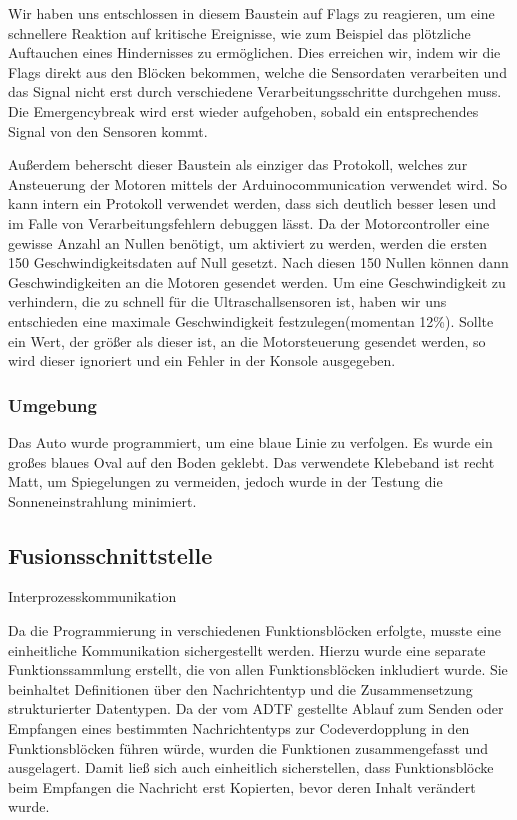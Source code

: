 \documentclass[12pt,a4paper]{report}
\begin{document}
Wir haben uns entschlossen in diesem Baustein auf Flags zu reagieren, um eine schnellere Reaktion auf kritische Ereignisse, wie zum Beispiel das plötzliche Auftauchen eines Hindernisses zu ermöglichen. Dies erreichen wir, indem wir die Flags direkt aus den Blöcken bekommen, welche die Sensordaten verarbeiten und das Signal nicht erst durch verschiedene Verarbeitungsschritte durchgehen muss. Die Emergencybreak wird erst wieder aufgehoben, sobald ein entsprechendes Signal von den Sensoren kommt.

Außerdem beherscht dieser Baustein als einziger das Protokoll, welches zur Ansteuerung der Motoren mittels der Arduinocommunication verwendet wird. So kann intern ein Protokoll verwendet werden, dass sich deutlich besser lesen und im Falle von Verarbeitungsfehlern debuggen lässt. Da der Motorcontroller eine gewisse Anzahl an Nullen benötigt, um aktiviert zu werden, werden die ersten 150 Geschwindigkeitsdaten auf Null gesetzt. Nach diesen 150 Nullen können dann Geschwindigkeiten an die Motoren gesendet werden. Um eine Geschwindigkeit zu verhindern, die zu schnell für die Ultraschallsensoren ist, haben wir uns entschieden eine maximale Geschwindigkeit festzulegen(momentan 12\%). Sollte ein Wert, der größer als dieser ist, an die Motorsteuerung gesendet werden, so wird dieser ignoriert und ein Fehler in der Konsole ausgegeben.

\subsubsection{Umgebung}
Das Auto wurde programmiert, um eine blaue Linie zu verfolgen. Es wurde ein großes blaues Oval auf den Boden geklebt. Das verwendete Klebeband ist recht Matt, um Spiegelungen zu vermeiden, jedoch wurde in der Testung die Sonneneinstrahlung minimiert.


\subsection{Fusionsschnittstelle}
Interprozesskommunikation

Da die Programmierung in verschiedenen Funktionsblöcken erfolgte, musste eine einheitliche Kommunikation sichergestellt werden. Hierzu wurde eine separate Funktionssammlung erstellt, die von allen Funktionsblöcken inkludiert wurde. Sie beinhaltet Definitionen über den Nachrichtentyp und die Zusammensetzung strukturierter Datentypen. Da der vom ADTF gestellte Ablauf zum Senden oder Empfangen eines bestimmten Nachrichtentyps zur Codeverdopplung in den Funktionsblöcken führen würde, wurden die Funktionen zusammengefasst und ausgelagert. Damit ließ sich auch einheitlich sicherstellen, dass Funktionsblöcke beim Empfangen die Nachricht erst Kopierten, bevor deren Inhalt verändert wurde.
\end{document}
